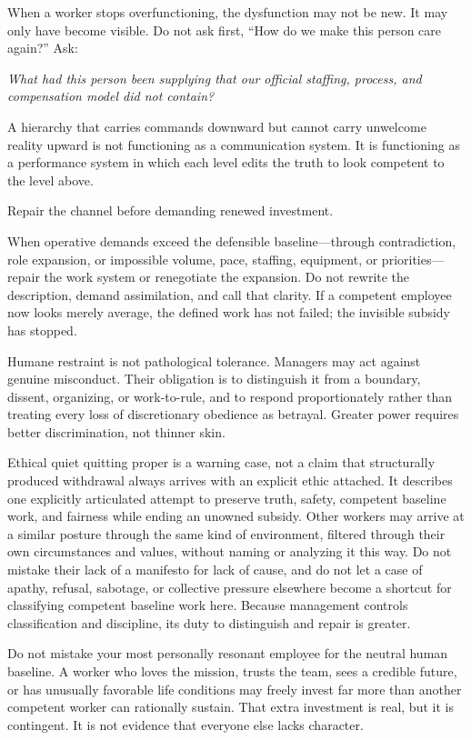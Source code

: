 \documentclass[11pt,oneside]{article}
\renewenvironment{quote}
  {\begin{tcolorbox}[
      enhanced,
      breakable,
      colback=ManifestLight,
      colframe=ManifestRule,
      boxrule=0pt,
      leftrule=3pt,
      arc=0pt,
      outer arc=0pt,
      left=10pt,right=10pt,top=8pt,bottom=8pt,
      before skip=0.8em,after skip=0.8em
    ]\itshape}
  {\end{tcolorbox}}
\begin{document}
When a worker stops overfunctioning, the dysfunction may not be new. It
may only have become visible. Do not ask first, ``How do we make this
person care again?'' Ask:

\begin{quote}
What had this person been supplying that our official staffing, process,
and compensation model did not contain?
\end{quote}

A hierarchy that carries commands downward but cannot carry unwelcome
reality upward is not functioning as a communication system. It is
functioning as a performance system in which each level edits the truth
to look competent to the level above.

Repair the channel before demanding renewed investment.

When operative demands exceed the defensible baseline---through
contradiction, role expansion, or impossible volume, pace, staffing,
equipment, or priorities---repair the work system or renegotiate the
expansion. Do not rewrite the description, demand assimilation, and call
that clarity. If a competent employee now looks merely average, the
defined work has not failed; the invisible subsidy has stopped.

Humane restraint is not pathological tolerance. Managers may act against
genuine misconduct. Their obligation is to distinguish it from a
boundary, dissent, organizing, or work-to-rule, and to respond
proportionately rather than treating every loss of discretionary
obedience as betrayal. Greater power requires better discrimination, not
thinner skin.

Ethical quiet quitting proper is a warning case, not a claim that
structurally produced withdrawal always arrives with an explicit ethic
attached. It describes one explicitly articulated attempt to preserve
truth, safety, competent baseline work, and fairness while ending an
unowned subsidy. Other workers may arrive at a similar posture through
the same kind of environment, filtered through their own circumstances
and values, without naming or analyzing it this way. Do not mistake
their lack of a manifesto for lack of cause, and do not let a case of
apathy, refusal, sabotage, or collective pressure elsewhere become a
shortcut for classifying competent baseline work here. Because
management controls classification and discipline, its duty to
distinguish and repair is greater.

Do not mistake your most personally resonant employee for the neutral
human baseline. A worker who loves the mission, trusts the team, sees a
credible future, or has unusually favorable life conditions may freely
invest far more than another competent worker can rationally sustain.
That extra investment is real, but it is contingent. It is not evidence
that everyone else lacks character.
\end{document}
